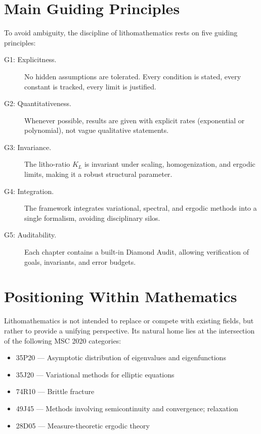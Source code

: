 \bigskip

\section*{Main Guiding Principles}
To avoid ambiguity, the discipline of lithomathematics rests on five guiding
principles:

\begin{description}
  \item[G1: Explicitness.] No hidden assumptions are tolerated. Every
  condition is stated, every constant is tracked, every limit is justified.
  \item[G2: Quantitativeness.] Whenever possible, results are given with
  explicit rates (exponential or polynomial), not vague qualitative statements.
  \item[G3: Invariance.] The litho-ratio $K_L$ is invariant under scaling,
  homogenization, and ergodic limits, making it a robust structural parameter.
  \item[G4: Integration.] The framework integrates variational, spectral, and
  ergodic methods into a single formalism, avoiding disciplinary silos.
  \item[G5: Auditability.] Each chapter contains a built-in Diamond Audit,
  allowing verification of goals, invariants, and error budgets.
\end{description}

\bigskip

\section*{Positioning Within Mathematics}
Lithomathematics is not intended to replace or compete with existing fields,
but rather to provide a unifying perspective. Its natural home lies at the
intersection of the following MSC 2020 categories:

\begin{itemize}
  \item 35P20 — Asymptotic distribution of eigenvalues and eigenfunctions
  \item 35J20 — Variational methods for elliptic equations
  \item 74R10 — Brittle fracture
  \item 49J45 — Methods involving semicontinuity and convergence; relaxation
  \item 28D05 — Measure-theoretic ergodic theory
\end{itemize}

